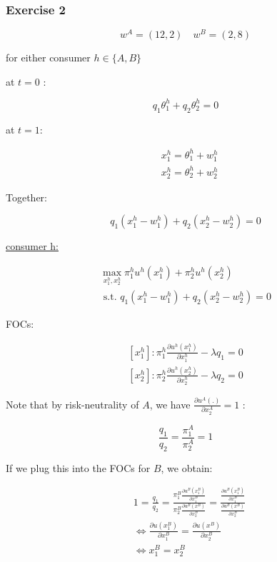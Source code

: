 {
\subsubsection*{Exercise 2}
$$
w^{A}=(12,2) \quad w^{B}=(2,8)
$$
\begin{enumerate}[label=(\alph*)]
{\item
for either consumer $h \in\{A, B\}$

at $t=0$ :

$$
q_{1} \theta_{1}^{h}+q_{2} \theta_{2}^{h}=0
$$

at $t=1$:

$$
\begin{aligned}
& x_{1}^{h}=\theta_{1}^{h}+w_{1}^{h} \\
& x_{2}^{h}=\theta_{2}^{h}+w_{2}^{h}
\end{aligned}
$$

Together:

$$
q_{1}\left(x_{1}^{h}-w_{1}^{h}\right)+q_{2}\left(x_{2}^{h}-w_{2}^{h}\right)=0
$$
}
{\item 
\underline{consumer h:}

$$
\begin{gathered}
\max _{x_{1}^h, x_{2}^{h}} \pi_{1}^{h} u^{h}\left(x_{1}^{h}\right)+\pi_{2}^{h} u^{h}\left(x_{2}^{h}\right) \\
\text { s.t. } q_{1}\left(x_{1}^{h}-w_{1}^{h}\right)+q_{2}\left(x_{2}^{h}-w_{2}^{h}\right)=0
\end{gathered}
$$

FOCs:

$$
\begin{gathered}
\left[x_{1}^{h}\right]: \pi_{1}^{h} \frac{\partial u^{h}\left(x_{1}^{h}\right)}{\partial x_{1}^{h}}-\lambda q_{1}=0 \\
{\left[x_{2}^{h}\right]: \pi_{2}^{h} \frac{\partial u^{h}\left(x_{2}^{h}\right)}{\partial x_{2}^{h}}-\lambda q_{2}=0}
\end{gathered}
$$

Note that by risk-neutrality of $A$, we have $\frac{\partial u^{A}(.)}{\partial x_{2}^{A}}=1$ :

$$
\frac{q_{1}}{q_{2}}=\frac{\pi_{1}^{A}}{\pi_{2}^{A}}=1
$$

If we plug this into the FOCs for $B$, we obtain:

$$
\begin{aligned}
& 1=\frac{q_{1}}{q_{2}}=\frac{\pi_{1}^{B} \frac{\partial u^{B}\left(x_{1}^{B}\right)}{\partial x_{1}^{B}}}{\pi_{2}^{B} \frac{\partial u^{B}\left(x^{B}\right)}{\partial x_{2}^{B}}}=\frac{\frac{\partial u^{B}\left(x_{1}^{B}\right)}{\partial x_{1}^{B}}}{\frac{\partial u^{B}\left(x^{B}\right)}{\partial x_{2}^{B}}} \\
& \Leftrightarrow \frac{\partial u\left(x_{1}^{B}\right)}{\partial x_{1}^{B}}=\frac{\partial u\left(x^{B}\right)}{\partial x_{2}^{B}} \\
& \Leftrightarrow x_{1}^{B}=x_{2}^{B}
\end{aligned}
$$

}
\end{enumerate}}
